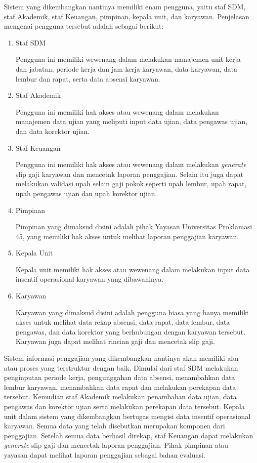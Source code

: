 	Sistem yang dikembangkan nantinya memiliki enam pengguna, yaitu staf SDM, staf Akademik, staf Keuangan, pimpinan, kepala unit, dan karyawan. Penjelasan mengenai pengguna tersebut adalah sebagai berikut:
	\begin{enumerate}
	    \itemsep0em
	    \item Staf SDM
	    
	    Pengguna ini memiliki wewenang dalam melakukan manajemen unit kerja dan jabatan, periode kerja dan jam kerja karyawan, data karyawan, data lembur dan rapat, serta data absensi karyawan.
	    \item Staf Akademik
	    
	    Pengguna ini memiliki hak akses atau wewenang dalam melakukan manajemen data ujian yang meliputi input data ujian, data pengawas ujian, dan data korektor ujian.
	    \item Staf Keuangan
	    
	    Pengguna ini memiliki hak akses atau wewenang dalam melakukan \emph{generate} slip gaji karyawan dan mencetak laporan penggajian. Selain itu juga dapat melakukan validasi upah selain gaji pokok seperti upah lembur, upah rapat, upah pengawas ujian dan upah korektor ujian.
	    \item Pimpinan
	    
	    Pimpinan yang dimaksud disini adalah pihak Yayasan Universitas Proklamasi 45, yang memiliki hak akses untuk melihat laporan penggajian karyawan.
	    
	    \item Kepala Unit
	    
	    Kepala unit memiliki hak akses atau wewenang dalam melakukan input data insentif operasional karyawan yang dibawahinya.
	    \item Karyawan
	    
	    Karyawan yang dimaksud disini adalah pengguna biasa yang hanya memiliki akses untuk melihat data rekap absensi, data rapat, data lembur, data pengawas, dan data korektor yang berhubungan dengan karyawan tersebut. Karyawan juga dapat melihat rincian gaji dan mencetak slip gaji.
	\end{enumerate}
	
	Sistem informasi penggajian yang dikembangkan nantinya akan memiliki alur atau proses yang terstruktur dengan baik. Dimulai dari staf SDM melakukan penginputan periode kerja, pengunggahan data absensi, menambahkan data lembur karyawan, menambahkan data rapat dan melakukan perekapan data tersebut. Kemudian staf Akademik melakukan penambahan data ujian, data pengawas dan korektor ujian serta melakukan perekapan data tersebut. Kepala unit dalam sistem yang dikembangkan bertugas mengisi data insentif operasional karyawan. Semua data yang telah disebutkan merupakan komponen dari penggajian. Setelah semua data berhasil direkap, staf Keuangan dapat melakukan \emph{generate} slip gaji dan mencetak laporan penggajian. Pihak pimpinan atau yayasan dapat melihat laporan penggajian sebagai bahan evaluasi.
	
